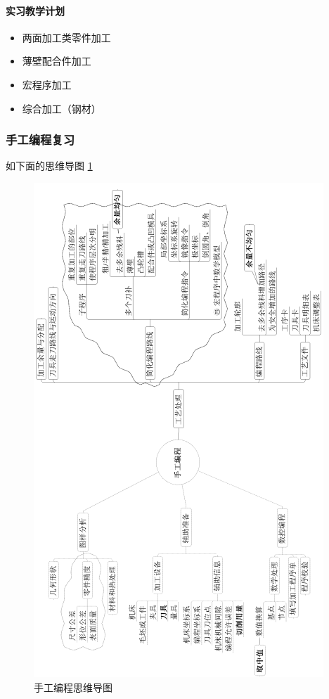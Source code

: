 \paragraph{实习教学计划}
\begin{itemize}
	\item 两面加工类零件加工

	\item 薄壁配合件加工

	\item 宏程序加工

	\item 综合加工（钢材）
\end{itemize}

\subsubsection{手工编程复习} 
如下面的思维导图 \ref{手工编程思维导图}
\begin{figure}	
	\includegraphics{images/图片1} 
	\caption{手工编程思维导图}\label{手工编程思维导图}
\end{figure}

